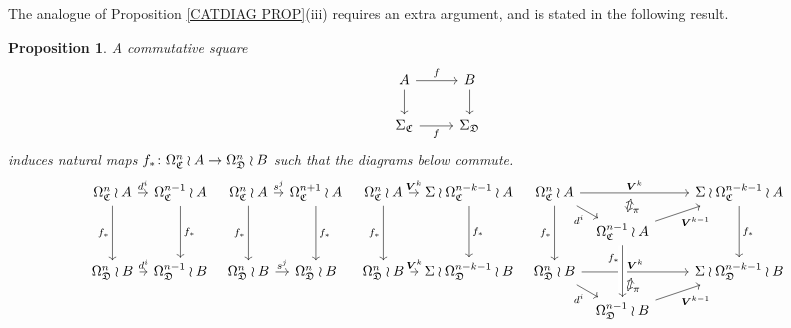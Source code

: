 \documentclass[a4paper,10pt
,draft
]{article}%
\numberwithin{equation}{section}
\numberwithin{figure}{section}
\newtheorem{proposition}[equation]{Proposition}%
\theoremstyle{definition} %
\newcommand{\1}{\ensuremath{\mathbbm 1}}%
\begin{document}
The analogue of Proposition \ref{CATDIAG PROP}(iii) requires an extra argument, and is stated in the following result.



\begin{proposition}\label{SPANPIECE PROP}
A commutative square
\begin{equation}\label{SPANPIECE EQ}
\begin{tikzcd}
	A \ar{d} \ar{r}{f} &  \ar{d} B
\\
	\Sigma_{\mathfrak{C}} \ar{r}[swap]{f} & \Sigma_{\mathfrak{D}}
\end{tikzcd}
\end{equation}
induces natural maps 
$f_{\**} \colon
\Omega_{\mathfrak{C}}^n \wr A \to 
\Omega_{\mathfrak{D}}^n \wr B $
such that the diagrams below commute.
\[
\begin{tikzcd}[column sep = 6pt, row sep = small]
	\Omega^n_{\mathfrak{C}} \wr A \ar{r}{d^i} \ar{dd}[swap]{f_{\**}} &
	\Omega^{n-1}_{\mathfrak{C}} \wr A \ar{dd}{f_{\**}}
&
	\Omega^n_{\mathfrak{C}} \wr A \ar{r}{s^j} \ar{dd}[swap]{f_{\**}} &
	\Omega^{n+1}_{\mathfrak{C}}\wr A \ar{dd}{f_{\**}}
&
	\Omega^n_{\mathfrak{C}} \wr A \ar{r}{\boldsymbol{V}^k} \ar{dd}[swap]{f_{\**}} &
	\Sigma \wr \Omega^{n-k-1}_{\mathfrak{C}} \wr A \ar{dd}{f_{\**}}
&
	\Omega^n_{\mathfrak{C}} \wr A
	\ar{rrrrr}[name=toE]{\boldsymbol{V}^k} \ar{rd}[swap]{d^i} \ar{dd}[swap]{f_{\**}}
	&&&
	&&
	\Sigma \wr \Omega^{n-k-1}_{\mathfrak{C}} \wr A  \ar{dd}{f_{\**}}
\\
	&
&
	&
&
	&
&
	&
	|[alias=DBE]|
	\Omega^{n-1}_{\mathfrak{C}} \wr A \ar{rrrru}[swap]{\boldsymbol{V}^{k-1}}
\\
	\Omega^n_{\mathfrak{D}} \wr B \ar{r}{d^i} &
	\Omega^{n-1}_{\mathfrak{D}} \wr B
&
	\Omega^n_{\mathfrak{D}} \wr B \ar{r}{s^j} &
	\Omega^n_{\mathfrak{D}} \wr B
&
	\Omega^n_{\mathfrak{D}} \wr B \ar{r}{\boldsymbol{V}^k} &
	\Sigma \wr \Omega^{n-k-1}_{\mathfrak{D}} \wr B
&
	\Omega^n_{\mathfrak{D}} \wr B \ar{rrrrr}[name=toB]{\boldsymbol{V}^k} \ar{rd}[swap]{d^i}
	&&&
	&&
	\Sigma \wr \Omega^{n-k-1}_{\mathfrak{D}} \wr B
\\
	&
&
	&
&
	&
&
	&
	|[alias=D]| \Omega^{n-1}_{\mathfrak{D}} \wr B \ar{rrrru}[swap]{\boldsymbol{V}^{k-1}}
\arrow[Leftrightarrow, from=DBE, to=toE, shorten <=0.15cm,shorten >=0.15cm
,swap,"\pi"
]
	\arrow[Leftrightarrow, from=D, to=toB, shorten <=0.15cm,shorten >=0.15cm,swap,"\pi"]
	\arrow[from=DBE, to=D, crossing over, near start, swap, "f_{\**}"]
\end{tikzcd}
\]
\end{proposition}
\end{document}

